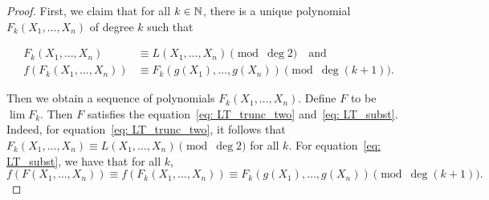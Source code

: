 \begin{proof}





    First, we claim that for all $k \in \mathbb{N}$,
    there is a unique polynomial $F_k(X_1, \ldots, X_n)$ of degree $k$ such that

    \begin{align*}
        F_k(X_1, \ldots , X_n) &\equiv L (X_1, \ldots, X_n) \pmod{\deg 2} \quad \text{and} \\
        f(F_k(X_1, \ldots , X_n)) &\equiv F_k(g(X_1), \ldots, g(X_n)) \pmod{\deg (k + 1)}.
    \end{align*}

    Then we obtain a sequence of polynomials $F_k(X_1, \ldots, X_n)$. Define
    $F$ to be $\lim F_k$. Then $F$ satisfies the equation~\eqref{eq: LT_trunc_two}
    and~\eqref{eq: LT_subst}. Indeed, for equation~\eqref{eq: LT_trunc_two}, it follows
    that $F_k(X_1, \ldots , X_n) \equiv L (X_1, \ldots, X_n) \pmod{\deg 2}$ for all $k$. For
    equation~\eqref{eq: LT_subst}, we have that for all $k$,
    \[f(F(X_1, \ldots, X_n)) \equiv f(F_k(X_1, \ldots, X_n)) \equiv
    F_k(g(X_1), \ldots, g(X_n)) \pmod{\deg (k + 1)}. \]


\end{proof}
